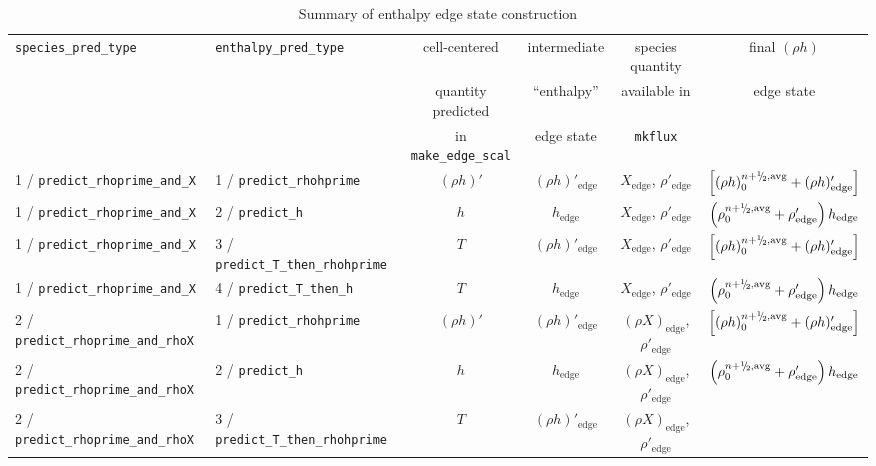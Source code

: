 \begin{landscape}
\begin{table}[t]
\caption{Summary of enthalpy edge state construction}
\label{table:pred:hoverview}
\renewcommand{\arraystretch}{1.5}
{\small
\centering
\begin{tabular}{l|l|c|c|c|c}
\hline
\hline
{\tt species\_pred\_type} &   
{\tt enthalpy\_pred\_type} &
{cell-centered} &
{intermediate} &
{species quantity} &
{final $(\rho h)$} \\[-5pt]
 &
 &
{quantity predicted} &
{``enthalpy''} &
{available in} &
{edge state} \\[-5pt]
 &
 &
{in {\tt make\_edge\_scal}} &
{edge state} &
{\tt mkflux} &
 \\
\hline 
1 / {\tt predict\_rhoprime\_and\_X}  & 1 / {\tt predict\_rhohprime} &
  $(\rho h)'$ & $(\rho h)'_\mathrm{edge}$ & 
  $X_\mathrm{edge}$, $\rho'_\mathrm{edge}$ & 
  $\left [ (\rho h)_0^{n+\myhalf,{\rm avg}} + (\rho h)'_\mathrm{edge} \right ]$ \\
1 / {\tt predict\_rhoprime\_and\_X}  & 2 / {\tt predict\_h} &
  $h$ & $h_\mathrm{edge}$ & 
  $X_\mathrm{edge}$, $\rho'_\mathrm{edge}$ & 
  $\left ( \rho_0^{n+\myhalf,{\rm avg}} + \rho'_\mathrm{edge} \right ) h_\mathrm{edge}$ \\
1 / {\tt predict\_rhoprime\_and\_X}  & 3 / {\tt predict\_T\_then\_rhohprime} &
  $T$ & $(\rho h)'_\mathrm{edge}$ & 
  $X_\mathrm{edge}$, $\rho'_\mathrm{edge}$ & 
  $\left [ (\rho h)_0^{n+\myhalf,{\rm avg}} + (\rho h)'_\mathrm{edge} \right ]$ \\
1 / {\tt predict\_rhoprime\_and\_X}  & 4 / {\tt predict\_T\_then\_h} &
  $T$ & $h_\mathrm{edge}$ & 
  $X_\mathrm{edge}$, $\rho'_\mathrm{edge}$ & 
  $\left ( \rho_0^{n+\myhalf,{\rm avg}} + \rho'_\mathrm{edge} \right ) h_\mathrm{edge}$ \\
\hline
\hline
2 / {\tt predict\_rhoprime\_and\_rhoX}  & 1 / {\tt predict\_rhohprime} &
  $(\rho h)'$ & $(\rho h)'_\mathrm{edge}$ & 
  $(\rho X)_\mathrm{edge}$, $\rho'_\mathrm{edge}$ & 
  $\left [ (\rho h)_0^{n+\myhalf,{\rm avg}} + (\rho h)'_\mathrm{edge} \right ]$ \\
2 / {\tt predict\_rhoprime\_and\_rhoX}  & 2 / {\tt predict\_h} &
  $h$ & $h_\mathrm{edge}$ & 
  $(\rho X)_\mathrm{edge}$, $\rho'_\mathrm{edge}$ & 
  $\left ( \rho_0^{n+\myhalf,{\rm avg}} + \rho'_\mathrm{edge} \right ) h_\mathrm{edge}$ \\
2 / {\tt predict\_rhoprime\_and\_rhoX}  & 3 / {\tt predict\_T\_then\_rhohprime} &
  $T$ & $(\rho h)'_\mathrm{edge}$ & 
  $(\rho X)_\mathrm{edge}$, $\rho'_\mathrm{edge}$ & 

\end{tabular}}
\end{table}
\end{landscape}
